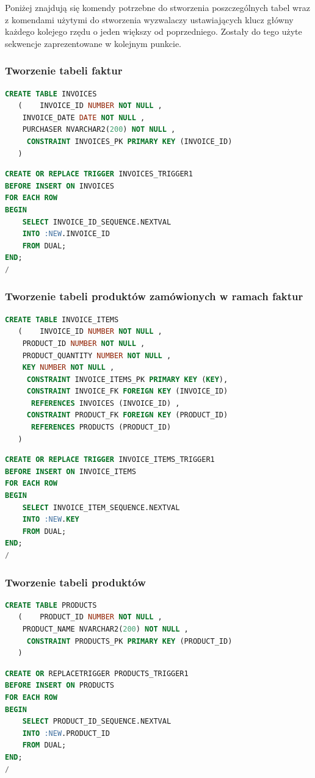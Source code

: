 \documentclass{article}
\begin{document}
Poniżej znajdują się komendy potrzebne do stworzenia poszczególnych tabel
wraz z komendami użytymi do stworzenia wyzwalaczy ustawiających klucz
główny każdego kolejego rzędu o jeden większy od poprzedniego. Zostały do
tego użyte sekwencje zaprezentowane w kolejnym punkcie.
\subsubsection{Tworzenie tabeli faktur}
\begin{lstlisting}[language=SQL,frame=single]
  CREATE TABLE INVOICES 
   (	INVOICE_ID NUMBER NOT NULL , 
	INVOICE_DATE DATE NOT NULL , 
	PURCHASER NVARCHAR2(200) NOT NULL , 
	 CONSTRAINT INVOICES_PK PRIMARY KEY (INVOICE_ID)
   ) 
\end{lstlisting}
\begin{lstlisting}[language=SQL,frame=single]
  CREATE OR REPLACE TRIGGER INVOICES_TRIGGER1 
BEFORE INSERT ON INVOICES
FOR EACH ROW
BEGIN
	SELECT INVOICE_ID_SEQUENCE.NEXTVAL
	INTO :NEW.INVOICE_ID
	FROM DUAL;
END;
/
\end{lstlisting}

\subsubsection{Tworzenie tabeli produktów zamówionych w ramach faktur}
\begin{lstlisting}[language=SQL,frame=single]
  CREATE TABLE INVOICE_ITEMS 
   (	INVOICE_ID NUMBER NOT NULL , 
	PRODUCT_ID NUMBER NOT NULL , 
	PRODUCT_QUANTITY NUMBER NOT NULL , 
	KEY NUMBER NOT NULL , 
	 CONSTRAINT INVOICE_ITEMS_PK PRIMARY KEY (KEY),
	 CONSTRAINT INVOICE_FK FOREIGN KEY (INVOICE_ID)
	  REFERENCES INVOICES (INVOICE_ID) , 
	 CONSTRAINT PRODUCT_FK FOREIGN KEY (PRODUCT_ID)
	  REFERENCES PRODUCTS (PRODUCT_ID) 
   )
\end{lstlisting}
\newpage
\begin{lstlisting}[language=SQL,frame=single]
  CREATE OR REPLACE TRIGGER INVOICE_ITEMS_TRIGGER1 
BEFORE INSERT ON INVOICE_ITEMS
FOR EACH ROW
BEGIN
	SELECT INVOICE_ITEM_SEQUENCE.NEXTVAL
	INTO :NEW.KEY
	FROM DUAL;
END;
/
\end{lstlisting}

\subsubsection{Tworzenie tabeli produktów}
\begin{lstlisting}[language=SQL,frame=single]
  CREATE TABLE PRODUCTS 
   (	PRODUCT_ID NUMBER NOT NULL , 
	PRODUCT_NAME NVARCHAR2(200) NOT NULL , 
	 CONSTRAINT PRODUCTS_PK PRIMARY KEY (PRODUCT_ID)
   )
\end{lstlisting}
\begin{lstlisting}[language=SQL,frame=single]
  CREATE OR REPLACETRIGGER PRODUCTS_TRIGGER1 
BEFORE INSERT ON PRODUCTS
FOR EACH ROW
BEGIN
	SELECT PRODUCT_ID_SEQUENCE.NEXTVAL
	INTO :NEW.PRODUCT_ID
	FROM DUAL;
END;
/
\end{lstlisting}
\end{document}
